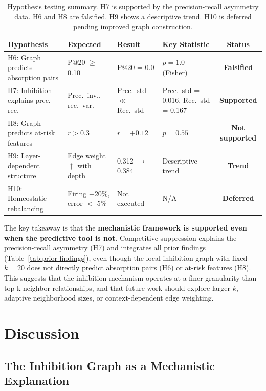 \documentclass{article}
\begin{document}
\begin{table}[t]
\centering
\small
\caption{Hypothesis testing summary. H7 is supported by the precision-recall asymmetry data. H6 and H8 are falsified. H9 shows a descriptive trend. H10 is deferred pending improved graph construction.}
\label{tab:hypothesis-summary}
\begin{tabular}{p{2.6cm}p{2.3cm}p{2.2cm}p{2.6cm}c}
\toprule
Hypothesis & Expected & Result & Key Statistic & Status \\
\midrule
H6: Graph predicts absorption pairs & P@20 $\geq$ 0.10 & P@20 = 0.0 & $p = 1.0$ (Fisher) & \textbf{Falsified} \\
H7: Inhibition explains prec.-rec.& Prec.~inv., rec.~var. & Prec.~std $\ll$ Rec.~std & Prec.~std = 0.016, Rec.~std = 0.167 & \textbf{Supported} \\
H8: Graph predicts at-risk features & $r > 0.3$ & $r = +0.12$ & $p = 0.55$ & \textbf{Not supported} \\
H9: Layer-dependent structure & Edge weight $\uparrow$ with depth & 0.312 $\to$ 0.384 & Descriptive trend & \textbf{Trend} \\
H10: Homeostatic rebalancing & Firing +20\%, error $<$ 5\% & Not executed & N/A & \textbf{Deferred} \\
\bottomrule
\end{tabular}
\end{table}

The key takeaway is that the \textbf{mechanistic framework is supported even when the predictive tool is not}. Competitive suppression explains the precision-recall asymmetry (H7) and integrates all prior findings (Table~\ref{tab:prior-findings}), even though the local inhibition graph with fixed $k = 20$ does not directly predict absorption pairs (H6) or at-risk features (H8). This suggests that the inhibition mechanism operates at a finer granularity than top-k neighbor relationships, and that future work should explore larger $k$, adaptive neighborhood sizes, or context-dependent edge weighting.

\section{Discussion}
\label{sec:discussion}

\subsection{The Inhibition Graph as a Mechanistic Explanation}
\end{document}
